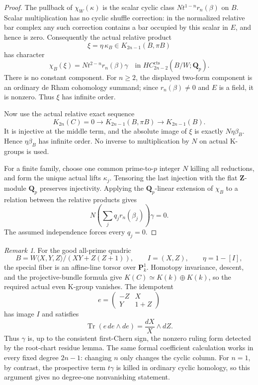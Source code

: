 \documentclass[11pt,a4paper]{amsart}
\numberwithin{equation}{section}
\theoremstyle{definition}
\theoremstyle{remark}
\newtheorem{remark}[theorem]{Remark}
\begin{document}
\begin{proof}
The pullback of $\chi_W(\kappa)$ is the scalar cyclic class
$Nt^{1-n}r_n(\beta)$ on $B$. Scalar multiplication has no cyclic
shuffle correction: in the normalized relative bar complex any
such correction contains a bar occupied by this scalar in $E$,
and hence is zero. Consequently the actual relative product
\[
       \xi=\eta\,\kappa_B\in K_{2n-1}(B,\pi B)
\]
has character
\begin{equation}\label{d3:eq:formalhigherTCcupvalue}
       \chi_B(\xi)=N t^{2-n}r_n(\beta)\gamma
       \quad\text{in }HC_{2n-2}^{\mathrm{cts}}(B/W;\mathbf Q_p).
\end{equation}
There is no constant component. For $n\geq2$, the displayed
two-form component is an ordinary de Rham cohomology summand;
since $r_n(\beta)\ne0$ and $E$ is a field, it is nonzero.
Thus $\xi$ has infinite order.

Now use the actual relative exact sequence
\[
 K_{2n}(C)=0\longrightarrow K_{2n-1}(B,\pi B)
                    \longrightarrow K_{2n-1}(B).
\]
It is injective at the middle term, and the absolute image of
$\xi$ is exactly $N\eta\beta_B$. Hence $\eta\beta_B$ has infinite
order. No inverse to multiplication by $N$ on actual K-groups is used.

For a finite family, choose one common prime-to-$p$ integer $N$
killing all reductions, and form the unique actual lifts
$\kappa_j$. Tensoring the last injection with the flat
$\mathbf Z$-module $\mathbf Q_p$ preserves injectivity.
Applying the $\mathbf Q_p$-linear extension of $\chi_B$ to a
relation between the relative products gives
\[
       N\left(\sum_j q_jr_n(\beta_j)\right)\gamma=0.
\]
The assumed independence forces every $q_j=0$.
\end{proof}

\begin{remark}
For the good all-prime quadric
\[
 B=W\langle X,Y,Z\rangle/(XY+Z(Z+1)),
 \qquad I=(X,Z),\qquad\eta=1-[I],
\]
the special fiber is an affine-line torsor over $\mathbf P^1_k$.
Homotopy invariance, descent, and the projective-bundle formula
give $K(C)\simeq K(k)\oplus K(k)$, so the required actual even
K-group vanishes. The idempotent
\[
 e=\begin{pmatrix}-Z&X\\Y&1+Z\end{pmatrix}
\]
has image $I$ and satisfies
\[
 \operatorname{Tr}(e\,de\wedge de)
                  =\frac{dX}{X}\wedge dZ.
\]
Thus $\gamma$ is, up to the consistent first-Chern sign, the
nonzero ruling form detected by the root-chart residue lemma.
The same formal coefficient calculation works in every fixed
degree $2n-1$: changing $n$ only changes the cyclic column.
For $n=1$, by contrast, the prospective term $t\gamma$ is killed
in ordinary cyclic homology, so this argument gives no
degree-one nonvanishing statement.
\end{remark}
\end{document}
